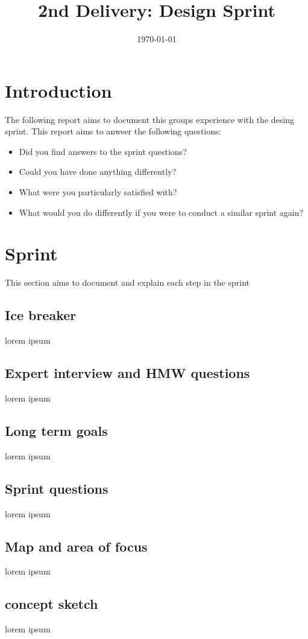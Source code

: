 \documentclass[12pt]{article}
\title{2nd Delivery: Design Sprint}
\date{\today}
\begin{document}
\subsectionfont{\fontsize{12}{14}\selectfont}

\maketitle

\tableofcontents

\section{Introduction}
The following report aims to document this groups experience with the desing sprint\cite{DesignSprint2024}.
This report aims to anwser the following questions:
\begin{itemize}
    \item Did you find answers to the sprint questions?
    \item Could you have done anything differently?
    \item What were you particularly satisfied with?
    \item What would you do differently if you were to conduct a similar sprint again?
\end{itemize}

\section{Sprint}
This section aims to document and explain each step in the sprint

\subsection{Ice breaker}
lorem ipsum
\subsection{Expert interview and HMW\cite{WhatHowMight} questions}
lorem ipsum
\subsection{Long term goals}
lorem ipsum
\subsection{Sprint questions}
lorem ipsum
\subsection{Map and area of focus}
lorem ipsum
\subsection{concept sketch}
lorem ipsum
\end{document}
